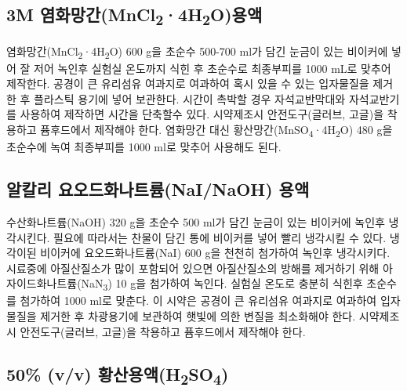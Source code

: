 \documentclass[
]{book}
\begin{document}
\hypertarget{m-uxc5fcuxd654uxb9dduxac04mncl24h2ouxc6a9uxc561}{%
\subsection{\texorpdfstring{3M 염화망간(MnCl\textsubscript{2}·4H\textsubscript{2}O)용액}{3M 염화망간(MnCl2·4H2O)용액}}\label{m-uxc5fcuxd654uxb9dduxac04mncl24h2ouxc6a9uxc561}}

염화망간(MnCl\textsubscript{2}·4H\textsubscript{2}O) 600 g을 초순수 500-700 ml가 담긴 눈금이 있는 비이커에 넣어 잘 저어 녹인후 실험실 온도까지 식힌 후 초순수로 최종부피를 1000 mL로 맞추어 제작한다. 공경이 큰 유리섬유 여과지로 여과하여 혹시 있을 수 있는 입자물질을 제거한 후 플라스틱 용기에 넣어 보관한다. 시간이 촉박할 경우 자석교반막대와 자석교반기를 사용하여 제작하면 시간을 단축할수 있다. 시약제조시 안전도구(글러브, 고글)을 착용하고 퓸후드에서 제작해야 한다. 염화망간 대신 황산망간(MnSO\textsubscript{4}·4H\textsubscript{2}O) 480 g을 초순수에 녹여 최종부피를 1000 ml로 맞추어 사용해도 된다.

\hypertarget{uxc54cuxce7cuxb9ac-uxc694uxc624uxb4dcuxd654uxb098uxd2b8uxb968nainaoh-uxc6a9uxc561}{%
\subsection{알칼리 요오드화나트륨(NaI/NaOH) 용액}\label{uxc54cuxce7cuxb9ac-uxc694uxc624uxb4dcuxd654uxb098uxd2b8uxb968nainaoh-uxc6a9uxc561}}

수산화나트륨(NaOH) 320 g을 초순수 500 ml가 담긴 눈금이 있는 비이커에 녹인후 냉각시킨다. 필요에 따라서는 찬물이 담긴 통에 비이커를 넣어 빨리 냉각시킬 수 있다. 냉각이된 비이커에 요오드화나트륨(NaI) 600 g을 천천히 첨가하여 녹인후 냉각시키다. 시료중에 아질산질소가 많이 포함되어 있으면 아질산질소의 방해를 제거하기 위해 아자이드화나트륨(NaN\textsubscript{3}) 10 g을 첨가하여 녹인다. 실험실 온도로 충분히 식힌후 초순수를 첨가하여 1000 ml로 맞춘다. 이 시약은 공경이 큰 유리섬유 여과지로 여과하여 입자물질을 제거한 후 차광용기에 보관하여 햇빛에 의한 변질을 최소화해야 한다. 시약제조시 안전도구(글러브, 고글)을 착용하고 퓸후드에서 제작해야 한다.

\hypertarget{vv-uxd669uxc0b0uxc6a9uxc561h2so4}{%
\subsection{\texorpdfstring{50\% (v/v) 황산용액(H\textsubscript{2}SO\textsubscript{4})}{50\% (v/v) 황산용액(H2SO4)}}\label{vv-uxd669uxc0b0uxc6a9uxc561h2so4}}
\end{document}
